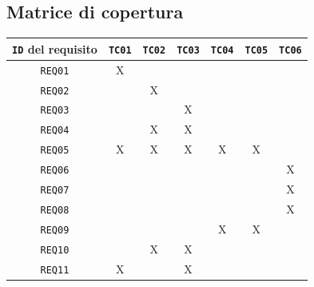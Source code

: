 \documentclass[target=bach,aauheader=,style=]{thud}
\begin{document}
\subsection{Matrice di copertura}
\begin{table}[H]
    \centering
    \begin{tabular}{|c|c|c|c|c|c|c|}
    \hline
    \texttt{ID} del requisito & \texttt{TC01} & \texttt{TC02} & \texttt{TC03} & \texttt{TC04} & \texttt{TC05} & \texttt{TC06}                      \\ \hline
    \texttt{REQ01} & X               &                 &                 &                 &                 &                       \\ \hline
    \texttt{REQ02} &                 & X               &                 &                 &                 &                       \\ \hline
    \texttt{REQ03} &                 &                 & X               &                 &                 &                       \\ \hline
    \texttt{REQ04} &                 & X               & X               &                 &                 &                       \\ \hline
    \texttt{REQ05} & X               & X               & X               & X               & X               &                       \\ \hline
    \texttt{REQ06} &                 &                 &                 &                 &                 & X                     \\ \hline
    \texttt{REQ07} &                 &                 &                 &                 &                 & X                     \\ \hline
    \texttt{REQ08} &                 &                 &                 &                 &                 & X                     \\ \hline
    \texttt{REQ09} &                 &                 &                 & X               & X               &                       \\ \hline
    \texttt{REQ10} &                 & X               & X               &                 &                 &                       \\ \hline
    \texttt{REQ11} & X               &                 & X               &                 &                 & \multicolumn{1}{l|}{} \\ \hline
    \end{tabular}
    \end{table}
\end{document}

